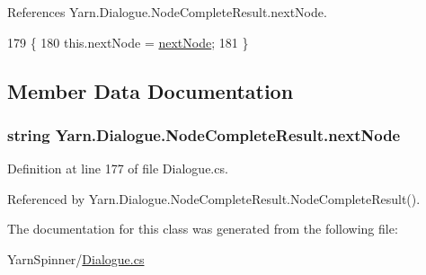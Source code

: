 References Yarn.\-Dialogue.\-Node\-Complete\-Result.\-next\-Node.


\begin{DoxyCode}
179                                                         \{
180                 this.nextNode = \hyperlink{a00133_ad48b37b51066b94cd48c58626ac0e774}{nextNode};
181             \}
\end{DoxyCode}


\subsection{Member Data Documentation}
\hypertarget{a00133_ad48b37b51066b94cd48c58626ac0e774}{
\subsubsection[{next\-Node}]{\setlength{\rightskip}{0pt plus 5cm}string Yarn.\-Dialogue.\-Node\-Complete\-Result.\-next\-Node}}\label{a00133_ad48b37b51066b94cd48c58626ac0e774}


Definition at line 177 of file Dialogue.\-cs.



Referenced by Yarn.\-Dialogue.\-Node\-Complete\-Result.\-Node\-Complete\-Result().



The documentation for this class was generated from the following file\-:\begin{DoxyCompactItemize}
\item 
Yarn\-Spinner/\hyperlink{a00296}{Dialogue.\-cs}\end{DoxyCompactItemize}
